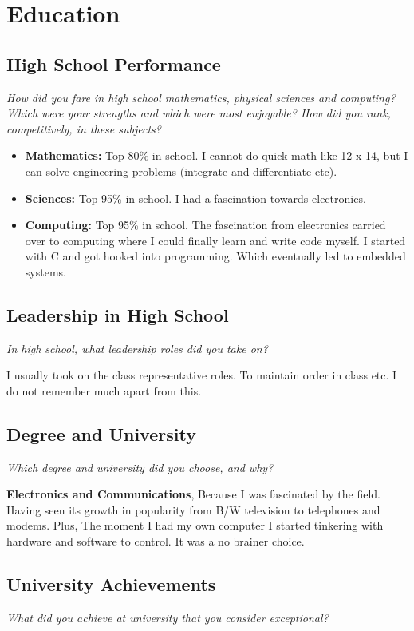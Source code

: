 \documentclass{article}
\begin{document}
\section{Education}
\subsection{High School Performance}
\small \textit{How did you fare in high school mathematics, physical sciences and computing? 
Which were your strengths and which were most enjoyable? How did you rank, competitively, in these subjects?} 
\normalsize 

\begin{itemize}
    \item \textbf{Mathematics:} Top 80\% in school. I cannot do quick math like 12 x 14, but I can solve engineering problems (integrate and differentiate etc).
    \item \textbf{Sciences:} Top 95\% in school. I had a fascination towards electronics.
    \item \textbf{Computing:} Top 95\% in school. The fascination from electronics carried over to computing where I could finally 
    learn and write code myself. I started with C and got hooked into programming. Which eventually led to embedded systems.
\end{itemize}

\subsection{Leadership in High School}
\small \textit{In high school, what leadership roles did you take on?} 
\normalsize 

I usually took on the class representative roles. To maintain order in class etc. I do not remember much apart from this.

\subsection{Degree and University}
\small \textit{Which degree and university did you choose, and why?} 
\normalsize 

\textbf{Electronics and Communications}, Because I was fascinated by the field. Having seen its growth in popularity 
from B/W television to telephones and modems. Plus, The moment I had my own computer I started tinkering with hardware and 
software to control. It was a no brainer choice. 

\subsection{University Achievements}
\small \textit{What did you achieve at university that you consider exceptional?} 
\normalsize 
\end{document}
